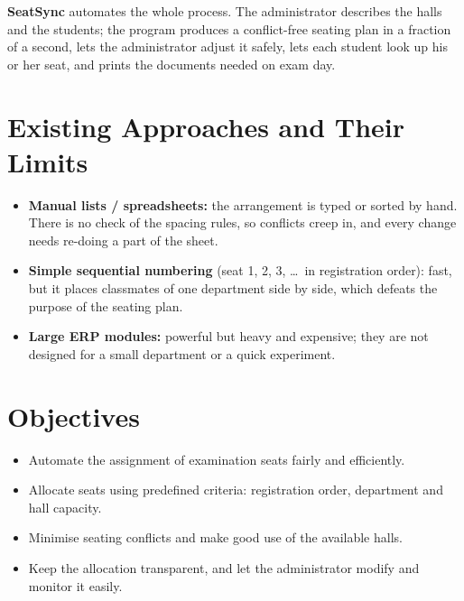 \documentclass[12pt,a4paper]{report}
\begin{document}
\textbf{SeatSync} automates the whole process. The administrator describes the halls and the students;
the program produces a conflict-free seating plan in a fraction of a second, lets the administrator adjust it
safely, lets each student look up his or her seat, and prints the documents needed on exam day.

\section{Existing Approaches and Their Limits}
\begin{itemize}
  \item \textbf{Manual lists / spreadsheets:} the arrangement is typed or sorted by hand. There is no check of
        the spacing rules, so conflicts creep in, and every change needs re-doing a part of the sheet.
  \item \textbf{Simple sequential numbering} (seat 1, 2, 3, \dots\ in registration order): fast, but it
        places classmates of one department side by side, which defeats the purpose of the seating plan.
  \item \textbf{Large ERP modules:} powerful but heavy and expensive; they are not designed for a small
        department or a quick experiment.
\end{itemize}

\section{Objectives}
\begin{itemize}
  \item Automate the assignment of examination seats fairly and efficiently.
  \item Allocate seats using predefined criteria: registration order, department and hall capacity.
  \item Minimise seating conflicts and make good use of the available halls.
  \item Keep the allocation transparent, and let the administrator modify and monitor it easily.
\end{itemize}
\end{document}
